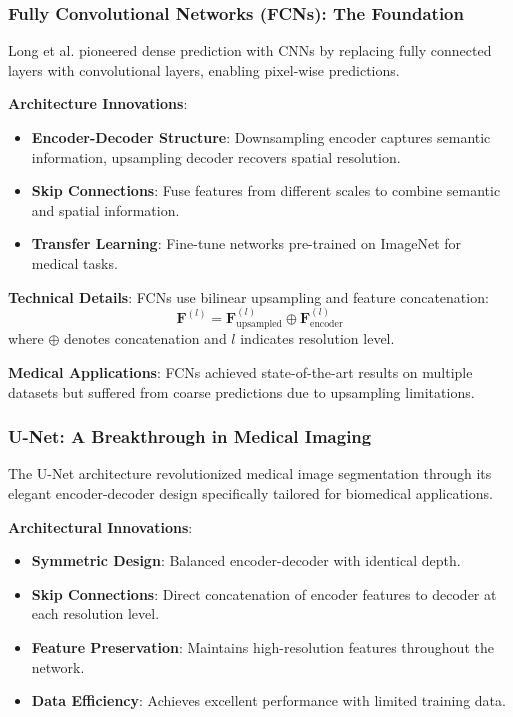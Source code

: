 \documentclass[12pt,a4paper]{article}
\begin{document}
\subsubsection{Fully Convolutional Networks (FCNs): The Foundation}

Long et al. \cite{long2015fcn} pioneered dense prediction with CNNs by replacing fully connected layers with convolutional layers, enabling pixel-wise predictions.

\textbf{Architecture Innovations}:
\begin{itemize}
    \item \textbf{Encoder-Decoder Structure}: Downsampling encoder captures semantic information, upsampling decoder recovers spatial resolution.
    \item \textbf{Skip Connections}: Fuse features from different scales to combine semantic and spatial information.
    \item \textbf{Transfer Learning}: Fine-tune networks pre-trained on ImageNet for medical tasks.
\end{itemize}

\textbf{Technical Details}:
FCNs use bilinear upsampling and feature concatenation:
\begin{equation}
\mathbf{F}^{(l)} = \mathbf{F}^{(l)}_{\text{upsampled}} \oplus \mathbf{F}^{(l)}_{\text{encoder}}
\end{equation}
where $\oplus$ denotes concatenation and $l$ indicates resolution level.

\textbf{Medical Applications}:
FCNs achieved state-of-the-art results on multiple datasets but suffered from coarse predictions due to upsampling limitations.

\subsubsection{U-Net: A Breakthrough in Medical Imaging}

The U-Net architecture \cite{ronneberger2015u} revolutionized medical image segmentation through its elegant encoder-decoder design specifically tailored for biomedical applications.

\textbf{Architectural Innovations}:
\begin{itemize}
    \item \textbf{Symmetric Design}: Balanced encoder-decoder with identical depth.
    \item \textbf{Skip Connections}: Direct concatenation of encoder features to decoder at each resolution level.
    \item \textbf{Feature Preservation}: Maintains high-resolution features throughout the network.
    \item \textbf{Data Efficiency}: Achieves excellent performance with limited training data.
\end{itemize}
\end{document}
